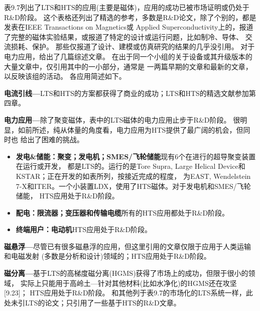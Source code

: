 表9.7列出了LTS和HTS的应用(主要是磁体)，应用的成功已被市场证明或仍处于R\&D阶段。
这个表格还列出了精选的参考，多数是R\&D论文，除了个别的，都是发表在IEEE Transactions on Magnetics或
Applied Superconductivity上的，报道了完整的磁体实验结果，或报道了特定的设计或运行问题，比如制冷、导体、
交流损耗、保护。
那些仅报道了设计、建模或仿真研究的结果的几乎没引用。
对于电力应用，给出了几篇综述文章。
在出于同一个小组的关于设备或其升级版本的大量文章中，仅引用其中的一小部分，通常是
一两篇早期的文章和最新的文章，以反映该组的活动。
各应用简述如下。

\textbf{电流引线---}LTS和HTS的方案都获得了商业的成功；LTS和HTS的精选文献参加第四章。

\textbf{电力应用---}除了聚变磁体，表中的LTS磁体的电力应用止步于R\&D阶段。
很明显，如前所述，纯从体量的角度看，电力应用为HTS提供了最广阔的机会，但同时也
给出了困难的挑战。
\begin{itemize}
	\item \textbf{发电\&储能：聚变；发电机；SMES/飞轮储能}\qquad 现有6个在进行的超导聚变装置在运行或开发，
	都是LTS的。运行的是Tore Supra, Large Helical Device和KSTAR；正在开发的如表所列，按接近完成的程度，
	为EAST, Wendelstein 7-X和ITER。一个小装置LDX，使用了HTS磁体。对于发电机和SMES/飞轮储能，
	HTS应用处于R\&D阶段。
	\item  \textbf{配电：限流器；变压器和传输电缆}\qquad 所有的HTS应用都处于R\&D阶段。
	\item \textbf{终端用户：电动机}\qquad HTS应用处于R\&D阶段。
\end{itemize}

\textbf{磁悬浮---}尽管已有很多磁悬浮的应用，但这里引用的文章仅限于应用于人类运输和电磁发射
(多数是分析和设计)领域的；HTS应用处于R\&D阶段。

\textbf{磁分离---}基于LTS的高梯度磁分离(HGMS)获得了市场上的成功，但限于很小的领域，
实际上只能用于高岭土---针对其他材料(比如水净化)的HGMS还在攻坚[9.23]；
HTS应用处于R\&D阶段。
和其他列于表9.7的市场化的LTS系统一样，此处未引LTS的论文；只引用了一些基于HTS的R\&D文章。

